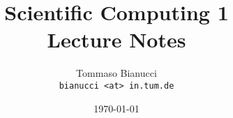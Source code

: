 
\graphicspath{ {Figures/} }

\title{Scientific Computing 1\\Lecture Notes}
\author{Tommaso Bianucci\\\small{\texttt{bianucci <at> in.tum.de}}}
\date{\today}


\maketitle
\tableofcontents
 


% 
% 
% 


